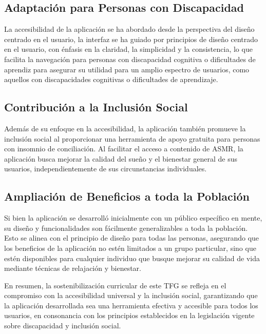 \documentclass[a4paper,12pt,twoside]{memoir}
\begin{document}
\subsection{Adaptación para Personas con Discapacidad}
La accesibilidad de la aplicación se ha abordado desde la perspectiva del diseño centrado en el usuario, la interfaz se ha guiado por principios de diseño centrado en el usuario, con énfasis en la claridad, la simplicidad y la consistencia, lo que facilita la navegación para personas con discapacidad cognitiva o dificultades de aprendiz para asegurar su utilidad para un amplio espectro de usuarios, como aquellos con discapacidades cognitivas o dificultades de aprendizaje.

\subsection{Contribución a la Inclusión Social}
Además de su enfoque en la accesibilidad, la aplicación también promueve la inclusión social al proporcionar una herramienta de apoyo gratuita para personas con insomnio de conciliación. Al facilitar el acceso a contenido de ASMR, la aplicación busca mejorar la calidad del sueño y el bienestar general de sus usuarios, independientemente de sus circunstancias individuales.

\subsection{Ampliación de Beneficios a toda la Población}
Si bien la aplicación se desarrolló inicialmente con un público específico en mente, su diseño y funcionalidades son fácilmente generalizables a toda la población. Esto se alinea con el principio de diseño para todas las personas, asegurando que los beneficios de la aplicación no estén limitados a un grupo particular, sino que estén disponibles para cualquier individuo que busque mejorar su calidad de vida mediante técnicas de relajación y bienestar.

En resumen, la sostenibilización curricular de este TFG se refleja en el compromiso con la accesibilidad universal y la inclusión social, garantizando que la aplicación desarrollada sea una herramienta efectiva y accesible para todos los usuarios, en consonancia con los principios establecidos en la legislación vigente sobre discapacidad y inclusión social.



 













\end{document}
